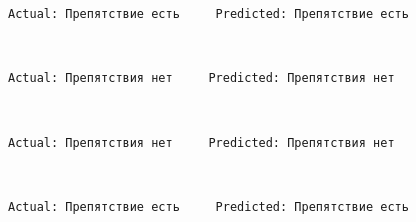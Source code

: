 \documentclass[11pt]{article}
\begin{document}
    \begin{Verbatim}[commandchars=\\\{\}]
Actual: Препятствие есть     Predicted: Препятствие есть

    \end{Verbatim}

    \begin{center}
    \end{center}
    { \hspace*{\fill} \\}
    
    \begin{Verbatim}[commandchars=\\\{\}]
Actual: Препятствия нет     Predicted: Препятствия нет

    \end{Verbatim}

    \begin{center}
    \end{center}
    { \hspace*{\fill} \\}
    
    \begin{Verbatim}[commandchars=\\\{\}]
Actual: Препятствия нет     Predicted: Препятствия нет

    \end{Verbatim}

    \begin{center}
    \end{center}
    { \hspace*{\fill} \\}
    
    \begin{Verbatim}[commandchars=\\\{\}]
Actual: Препятствие есть     Predicted: Препятствие есть

    \end{Verbatim}

    \begin{center}
    \end{center}
    { \hspace*{\fill} \\}
    
\end{document}
